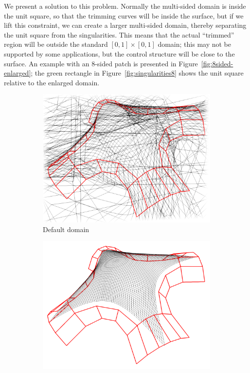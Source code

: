 \documentclass[9pt,academicons]{article}
\begin{document}
We present a solution to this problem. Normally the multi-sided domain is inside the unit
square, so that the trimming curves will be inside the
surface, but if we lift this constraint, we can create a larger multi-sided domain,
thereby separating the unit square from the singularities. This means that the actual ``trimmed''
region will be outside the standard $[0,1]\times[0,1]$ domain; this may not be supported by some
applications, but the control structure will be close to the surface.
An example with an 8-sided patch is presented in Figure~\ref{fig:8sided-enlarged};
the green rectangle in Figure~\ref{fig:singularities8} shows
the unit square relative to the enlarged domain.
\begin{figure}
  \begin{subfigure}{.3\textwidth}
    \centering
    \includegraphics[width=\textwidth]{images/8sided-1.png}
    \caption{Default domain}
    \label{fig:8sided-default}
  \end{subfigure}
  \hfill
  \begin{subfigure}{.3\textwidth}
    \centering
    \includegraphics[width=\textwidth]{images/8sided-2.png}

\end{subfigure}
\end{figure}
\end{document}
